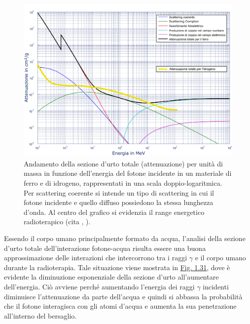 \documentclass[12pt,a4paper,twoside]{report}
\begin{document}
	\begin{figure}[H]
		\centering
		\includegraphics[width=0.9\linewidth]{attenuation.pdf}
		\caption{Andamento della sezione d'urto totale (attenuazione) per unità di massa in funzione dell'energia del fotone incidente in un materiale di ferro e di idrogeno, rappresentati in una scala doppio-logaritmica. Per scattering coerente si intende un tipo di scattering in cui il fotone incidente e quello diffuso possiedono la stessa lunghezza d'onda. Al centro del grafico si evidenzia il range energetico radioterapico (cita
			,
			).}
		\label{fig:attenuation}
	\end{figure}
	
	Essendo il corpo umano principalmente formato da acqua, l'analisi della sezione d'urto totale dell'interazione fotone-acqua risulta essere una buona approssimazione delle interazioni che intercorrono tra i raggi $\gamma$ e il corpo umano durante la radioterapia. Tale situazione viene mostrata in \hyperref[fig:attenuation_water]{Fig. 1.31}, dove è evidente la diminuzione esponenziale della sezione d'urto all'aumentare dell'energia. Ciò avviene perché aumentando l'energia dei raggi $\gamma$ incidenti diminuisce l'attenuazione da parte dell'acqua e quindi si abbassa la probabilità che il fotone interagisca con gli atomi d'acqua e aumenta la sua penetrazione all'interno del bersaglio.
\end{document}
